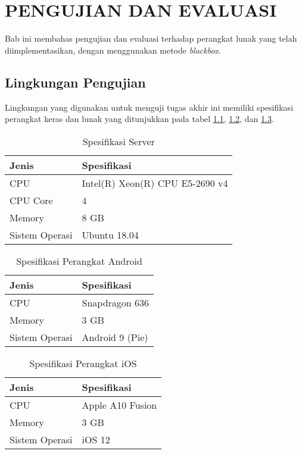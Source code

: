 \chapter{PENGUJIAN DAN EVALUASI}
\par Bab ini membahas pengujian dan evaluasi terhadap perangkat lunak yang telah diimplementasikan, dengan menggunakan metode \textit{blackbox}.

\section{Lingkungan Pengujian}
\par Lingkungan yang digunakan untuk menguji tugas akhir ini memiliki spesifikasi perangkat keras dan lunak yang ditunjukkan pada tabel \ref{5:tabel_spesifikasi_server}, \ref{5:tabel_spesifikasi_perangkat_android}, dan \ref{5:tabel_spesifikasi_perangkat_ios}.
\begin{longtable}{|p{3cm}|p{6.5cm}|}
	\caption{Spesifikasi Server} \label{5:tabel_spesifikasi_server} \\ \hline
    \textbf{Jenis} & \textbf{Spesifikasi} \\ \hline
    CPU & Intel(R) Xeon(R) CPU E5-2690 v4 \\ \hline
    CPU Core & 4 \\ \hline
    Memory & 8 GB \\ \hline
    Sistem Operasi & Ubuntu 18.04 \\ \hline
\end{longtable}
\begin{longtable}{|p{3cm}|p{6.5cm}|}
	\caption{Spesifikasi Perangkat Android} \label{5:tabel_spesifikasi_perangkat_android} \\ \hline
    \textbf{Jenis} & \textbf{Spesifikasi} \\ \hline
    CPU & Snapdragon 636 \\ \hline
    Memory & 3 GB \\ \hline
    Sistem Operasi & Android 9 (Pie) \\ \hline
\end{longtable}
\begin{longtable}{|p{3cm}|p{6.5cm}|}
	\caption{Spesifikasi Perangkat iOS} \label{5:tabel_spesifikasi_perangkat_ios} \\ \hline
    \textbf{Jenis} & \textbf{Spesifikasi} \\ \hline
    CPU & Apple A10 Fusion \\ \hline
    Memory & 3 GB \\ \hline
    Sistem Operasi & iOS 12 \\ \hline
\end{longtable}

